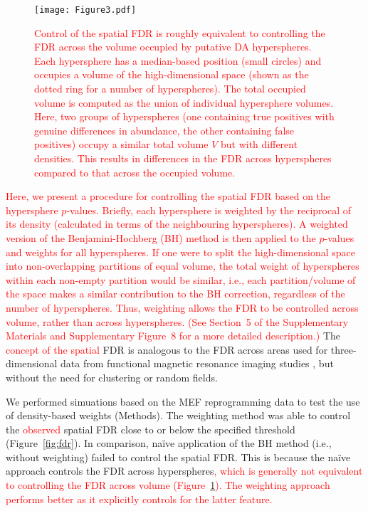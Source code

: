 \documentclass{article}
\newcommand\revised[1]{\textcolor{red}{#1}}
\newcommand{\suppfdr}{5}
\newcommand{\suppfigfdr}{8}
\begin{document}
\begin{figure}[bt]
\begin{center}
\texttt{[image: Figure3.pdf]}
\end{center}
\caption{\revised{Control of the spatial FDR is roughly equivalent to controlling the FDR across the volume occupied by putative DA hyperspheres.
    Each hypersphere has a median-based position (small circles) and occupies a volume of the high-dimensional space (shown as the dotted ring for a number of hyperspheres).
    The total occupied volume is computed as the union of individual hypersphere volumes.
    Here, two groups of hyperspheres (one containing true positives with genuine differences in abundance, the other containing false positives) occupy a similar total volume $V$ but with different densities.
This results in differences in the FDR across hyperspheres compared to that across the occupied volume.
}}
\label{fig:fdrexample}
\end{figure}

\revised{Here, we present a procedure for controlling the spatial FDR based on the hypersphere $p$-values.
    Briefly, each hypersphere is weighted by the reciprocal of its density (calculated in terms of the neighbouring hyperspheres).
    A weighted version of the Benjamini-Hochberg (BH) method \cite{benjamini1997multiple} is then applied to the $p$-values and weights for all hyperspheres.
    If one were to split the high-dimensional space into non-overlapping partitions of equal volume, the total weight of hyperspheres within each non-empty partition would be similar, i.e., each partition/volume of the space makes a similar contribution to the BH correction, regardless of the number of hyperspheres.
    Thus, weighting allows the FDR to be controlled across volume, rather than across hyperspheres.
(See Section~\suppfdr{} of the Supplementary Materials and Supplementary Figure~\suppfigfdr{} for a more detailed description.)}
    The \revised{concept of the spatial} FDR is analogous to the FDR across areas used for three-dimensional data from functional magnetic resonance imaging studies \cite{pacifico2004false,benjamini2007false}, but without the need for clustering or random fields.

We performed simuations based on the MEF reprogramming data to test the use of density-based weights (Methods).
The weighting method was able to control the \revised{observed} spatial FDR close to or below the specified threshold (Figure~\ref{fig:fdr}).
In comparison, na\"ive application of the BH method (i.e., without weighting) failed to control the spatial FDR.
This is because the na\"ive approach controls the FDR across hyperspheres\revised{, which is generally not equivalent to controlling the FDR across volume (Figure~\ref{fig:fdrexample}).
The weighting approach performs better as it explicitly controls for the latter feature.}
\end{document}
